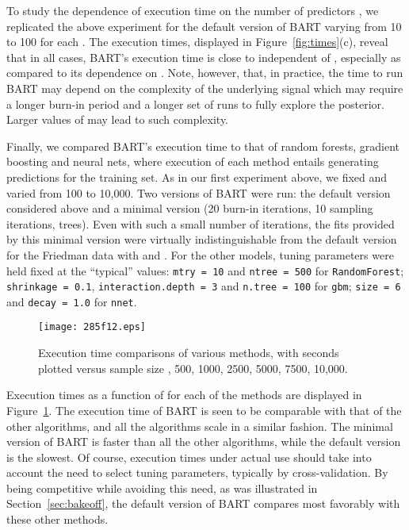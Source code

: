 \documentclass[aoas,nameyear,dvips]{arximspdf}
\begin{document}
To study the dependence of execution time on the number of predictors
, we replicated the above experiment for the default version of BART
varying  from 10 to 100 for each .  The execution times,
displayed in Figure~\ref{fig:times}(c), reveal that in all cases,
BART's execution time is close to independent of , especially as
compared to its dependence on .  Note, however, that, in practice,
the time to run BART may depend on the complexity of the underlying
signal which may require a longer burn-in period  and a longer set of
runs to fully explore the posterior.  Larger values of  may lead to
such complexity.

Finally, we compared BART's execution time to that of random forests,
gradient boosting and neural nets, where execution of each method
entails generating predictions for the training set.  As in our first
experiment above, we fixed  and varied  from 100 to 10,000.
Two versions of BART were run: the default version considered above and
a minimal version (20 burn-in iterations, 10 sampling iterations,  trees).  Even with such a small number of iterations, the fits
provided by this minimal version were virtually indistinguishable from
the default version for the Friedman data with  and . For
the other models, tuning parameters were held fixed at the ``typical''
values: \texttt{mtry = 10} and \texttt{ntree = 500} for
\texttt{RandomForest}; \texttt{shrinkage = 0.1},
\texttt{interaction.depth = 3} and \texttt{n.tree = 100} for
\texttt{gbm};  \texttt{size = 6} and  \texttt{decay = 1.0} for
\texttt{nnet}.

\begin{figure}[b]

\texttt{[image: 285f12.eps]}

\caption{Execution time comparisons of various methods, with  seconds plotted versus sample
size , 500, 1000, 2500, 5000, 7500, 10,000.}
\label{fig:compare}
\end{figure}

Execution times as a function of  for each of the methods are
displayed in Figure~\ref{fig:compare}.   The execution time of BART is
seen to be comparable with that of the other algorithms, and all the
algorithms scale in a similar fashion.  The minimal version of BART is
faster than all the other algorithms, while the default version is the
slowest.  Of course,  execution times under actual use should take into
account the need to select tuning parameters, typically by
cross-validation.   By being competitive while avoiding this need, as
was illustrated in Section~\ref{sec:bakeoff}, the default version of
BART compares most favorably with these other methods.
\end{document}
